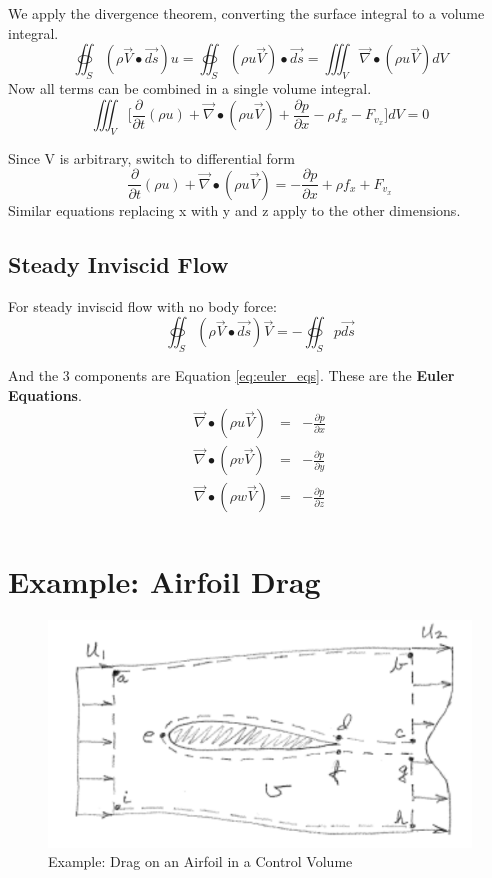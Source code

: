 \documentclass[draft=false, titlepage]{article}
\newcommand{\gradient}{\vec{\nabla}}
\newcommand{\deldelt}{\frac{\partial}{\partial t}}
\newcommand{\volumeint}{\iiint_V}
\begin{document}
We apply the divergence theorem, converting the surface integral to a volume integral.
\begin{equation}
    \oiint_S (\rho \vec{V} \bullet\vec{ds}) u = \oiint_S (\rho u\vec{V}) \bullet\vec{ds} = \volumeint \gradient \bullet (\rho u \vec{V}) dV
\end{equation}
Now all terms can be combined in a single volume integral.
\begin{equation}
    \volumeint\Big[ \deldelt (\rho u) + \gradient \bullet(\rho u \vec{V}) + \frac{\partial p}{\partial x} - \rho f_x -F_{v_x} \Big] dV = 0
\end{equation}

Since V is arbitrary, switch to differential form
\begin{equation}
    \deldelt (\rho u) + \gradient \bullet(\rho u \vec{V}) = -\frac{\partial p}{\partial x} + \rho f_x + F_{v_x}
\end{equation}
Similar equations replacing x with y and z apply to the other dimensions.
\subsection{Steady Inviscid Flow}
For steady inviscid flow with no body force:
\begin{equation}
    \oiint_S (\rho \vec{V} \bullet \vec{ds}) \vec{V} = -\oiint_S p \vec{ds}
\end{equation}

And the 3 components are Equation \ref{eq:euler_eqs}. These are the \textbf{Euler Equations}.
\begin{equation}
    \begin{array}{rcl}
         \gradient \bullet(\rho u \vec{V}) &=& -\frac{\partial p}{\partial x} \\
         \gradient \bullet(\rho v \vec{V}) &=& -\frac{\partial p}{\partial y} \\
         \gradient \bullet(\rho w \vec{V}) &=& -\frac{\partial p}{\partial z} \\
    \end{array}
    \label{eq:euler_eqs}
\end{equation}

\section{Example: Airfoil Drag}
\begin{figure}[ht]
    \centering
    \includegraphics[width=0.7\linewidth]{Figures/airfoil_drag.PNG}
    \caption{Example: Drag on an Airfoil in a Control Volume}
    \label{fig:airfoil_drag}
\end{figure}
\end{document}
